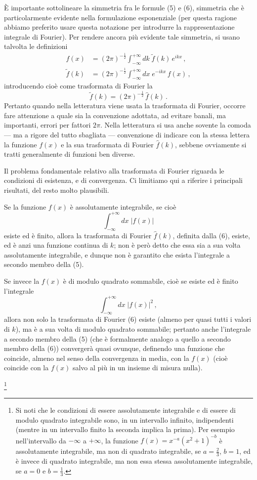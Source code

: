 \documentclass[11pt, a4paper]{book}
\numberwithin{equation}{section}
\begin{document}
È importante sottolineare la simmetria fra le formule (5) e (6), simmetria che è particolarmente evidente nella formulazione esponenziale (per questa ragione abbiamo preferito usare questa notazione per introdurre la rappresentazione integrale di Fourier). Per rendere ancora più evidente tale simmetria, si usano talvolta le definizioni
\begin{align*}
  f(x) &= (2\pi)^{-\frac{1}{2}}\int_{-\infty}^{+\infty} dk\;\tilde{f}(k)\,e^{ikx}\,,\\
  \tilde{f}(k) &= (2\pi)^{-\frac{1}{2}}\int_{-\infty}^{+\infty} dx\;e^{-ikx}\,f(x)\,,
\end{align*}
introducendo cioè come trasformata di Fourier la
\[
  \tilde{f}(k) = (2\pi)^{-\frac{1}{2}}\,\hat{f}(k)\,.
\]
Pertanto quando nella letteratura viene usata la trasformata di Fourier, occorre fare attenzione a quale sia la convenzione adottata, ad evitare banali, ma importanti, errori per fattori $2\pi$. Nella letteratura si usa anche sovente la comoda --- ma a rigore del tutto sbagliata --- convenzione di indicare con la stessa lettera la funzione $f(x)$ e la sua trasformata di Fourier $\hat{f}(k)$, sebbene ovviamente si tratti generalmente di funzioni ben diverse.

Il problema fondamentale relativo alla trasformata di Fourier riguarda le condizioni di esistenza, e di convergenza. Ci limitiamo qui a riferire i principali risultati, del resto molto plausibili.

Se la funzione $f(x)$ è assolutamente integrabile, se cioè
\[
  \int_{-\infty}^{+\infty} dx\;|f(x)|
\]
esiste ed è finito, allora la trasformata di Fourier $\hat{f}(k)$, definita dalla (6), esiste, ed è anzi una funzione continua di $k$; non è però detto che essa sia a sua volta assolutamente integrabile, e dunque non è garantito che esista l'integrale a secondo membro della (5).

Se invece la $f(x)$ è di modulo quadrato sommabile, cioè se esiste ed è finito l'integrale
\[
  \int_{-\infty}^{+\infty} dx\;|f(x)|^2\,,
\]
allora non solo la trasformata di Fourier (6) esiste (almeno per quasi tutti i valori di $k$), ma è a sua volta di modulo quadrato sommabile; pertanto anche l'integrale a secondo membro della (5) (che è formalmente analogo a quello a secondo membro della (6)) convergerà quasi ovunque, definendo una funzione che coincide, almeno nel senso della convergenza in media, con la $f(x)$ (cioè coincide con la $f(x)$ salvo al più in un insieme di misura nulla).

\footnote{Si noti che le condizioni di essere assolutamente integrabile e di essere di modulo quadrato integrabile sono, in un intervallo infinito, indipendenti (mentre in un intervallo finito la seconda implica la prima). Per esempio nell'intervallo da $-\infty$ a $+\infty$, la funzione $f(x) = x^{-a}(x^2+1)^{-b}$ è assolutamente integrabile, ma non di quadrato integrabile, se $a=\frac{2}{3}$, $b=1$, ed è invece di quadrato integrabile, ma non essa stessa assolutamente integrabile, se $a=0$ e $b=\frac{1}{3}$.}
\end{document}
